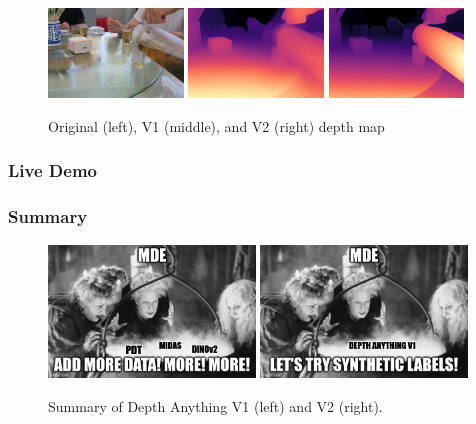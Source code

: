 \documentclass[12pt]{beamer}
\begin{document}
\begin{frame}
\begin{figure}
        \includegraphics[width=0.32\textwidth]{./figures/tea.JPG}
        \includegraphics[width=0.32\textwidth]{./figures/tea_v1-small.png}
        \includegraphics[width=0.32\textwidth]{./figures/tea_v2-small.png}
        \caption{Original (left), V1 (middle), and V2 (right) depth map}
        \label{fig:res_2}
    \end{figure}
\end{frame}

\begin{frame}
    \frametitle{Live Demo}
    
\end{frame}

\begin{frame}
    \frametitle{Summary}
    
        
    \begin{figure}
        \centering
        \includegraphics[width=0.49\textwidth]{./figures/summary_v1.jpg}
        \includegraphics[width=0.49\textwidth]{./figures/summary_v2.jpeg}
        \caption{Summary of Depth Anything V1 (left) and V2 (right).}
        \label{fig:summary}
    \end{figure}
\end{frame}
\end{document}
